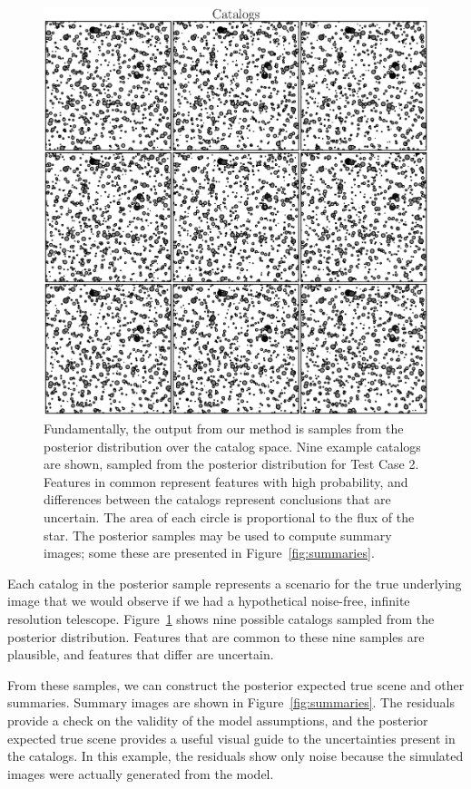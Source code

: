 \documentclass[12pt, preprint]{aastex}
\begin{document}
\begin{figure}[ht!]
\begin{center}
\includegraphics[scale=0.6]{Figures/catalogs.eps}
\end{center}
\caption{Fundamentally, the output from our method is samples from the posterior
distribution over the catalog space. Nine example catalogs are shown, sampled from the posterior distribution for
Test Case 2. Features in common represent features with high probability,
and differences between the catalogs represent conclusions that are uncertain.
The area of each circle is proportional to the flux of the star.
The posterior samples may be used to compute summary images; some these are presented
in Figure~\ref{fig:summaries}.
\label{fig:catalogs}}
\end{figure}

Each catalog in the posterior sample represents a scenario for the true
underlying image that we would observe if we had a hypothetical noise-free,
infinite resolution telescope. Figure~\ref{fig:catalogs} shows nine possible catalogs
sampled from the posterior distribution. Features that are common to these nine samples are plausible, and features that differ are uncertain.

From these samples, we can construct the
posterior expected true scene and other summaries. Summary images are shown in Figure~\ref{fig:summaries}. The residuals
provide a check on the validity of the model assumptions, and the posterior expected true
scene provides a useful visual guide to the uncertainties present in the catalogs. In this example,
the residuals show only noise because the simulated images were actually generated from the model.
\end{document}
